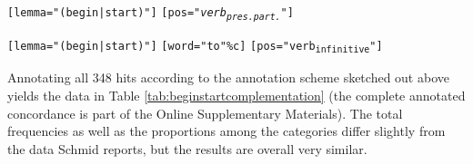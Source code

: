 \begin{exe}
\ex
\begin{xlist} 
\label{ex:beginstartquery}
\ex \begin{minipage}[t]{\textwidth} \raggedright \texttt{[lemma="(begin|start)"]} \texttt{[pos="\textit{verb\textsubscript{pres.part.}}"]} \end{minipage}
\ex \begin{minipage}[t]{\textwidth} \raggedright \texttt{[lemma="(begin|start)"]} \texttt{[word="to"\%c]} \texttt{[pos="verb\textsubscript{infinitive}"]} \end{minipage}
\end{xlist}
\end{exe}

Annotating all 348 hits according to the annotation scheme sketched out above yields the data in Table \ref{tab:beginstartcomplementation} (the complete annotated concordance is part of the Online Supplementary Materials). The total frequencies as well as the proportions among the categories differ slightly from the data Schmid reports, but the results are overall very similar.

